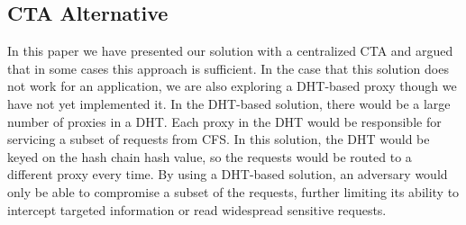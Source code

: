 \documentclass[a4paper,twoside]{article}
\begin{document}



\subsection{CTA Alternative}

In this paper we have presented our solution with a centralized CTA and argued that in some cases this approach is sufficient.  In the case that this solution does not work for an application, we are also exploring a DHT-based proxy though we have not yet implemented it.  In the DHT-based solution, there would be a large number of proxies in a DHT.  Each proxy in the DHT would be responsible for servicing a subset of requests from CFS.  In this solution, the DHT would be keyed on the hash chain hash value, so the requests would be routed to a different proxy every time.  By using a DHT-based solution, an adversary would only be able to compromise a subset of the requests, further limiting its ability to intercept targeted information or read widespread sensitive requests.  
\end{document}

